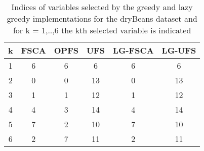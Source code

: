 \begin{table}
	\begin{center}
		\begin{tabular}{c c c c c c}
			k & FSCA & OPFS & UFS & LG-FSCA & LG-UFS \\
			\hline
			1 & 6 & 6 & 6 & 6 & 6 \\
			2 & 0 & 0 & 13 & 0 & 13 \\
			3 & 1 & 1 & 12 & 1 & 12 \\
			4 & 4 & 3 & 14 & 4 & 14 \\
			5 & 7 & 2 & 10 & 7 & 10 \\
			6 & 2 & 7 & 11 & 2 & 11 \\
		\end{tabular}
	\end{center}
	\caption{Indices of variables selected by the greedy and lazy greedy implementations for the dryBeans dataset and for k = 1,..,6 the kth selected variable is indicated}
\end{table}